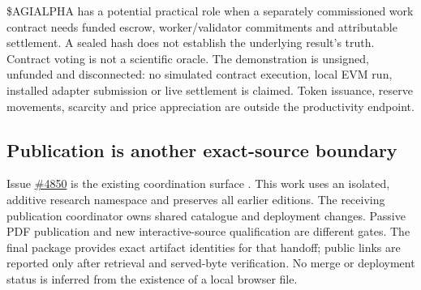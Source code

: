 \$AGIALPHA has a potential practical role when a separately commissioned work contract needs funded escrow, worker/validator commitments and attributable settlement. A sealed hash does not establish the underlying result's truth. Contract voting is not a scientific oracle. The demonstration is unsigned, unfunded and disconnected: no simulated contract execution, local EVM run, installed adapter submission or live settlement is claimed. Token issuance, reserve movements, scarcity and price appreciation are outside the productivity endpoint.

\subsection{Publication is another exact-source boundary}

Issue \href{https://github.com/MontrealAI/AGI-Alpha-Agent-v0/issues/4850}{\#4850} is the existing coordination surface \citep{alphaCoordination2026}. This work uses an isolated, additive research namespace and preserves all earlier editions. The receiving publication coordinator owns shared catalogue and deployment changes. Passive PDF publication and new interactive-source qualification are different gates. The final package provides exact artifact identities for that handoff; public links are reported only after retrieval and served-byte verification. No merge or deployment status is inferred from the existence of a local browser file.

